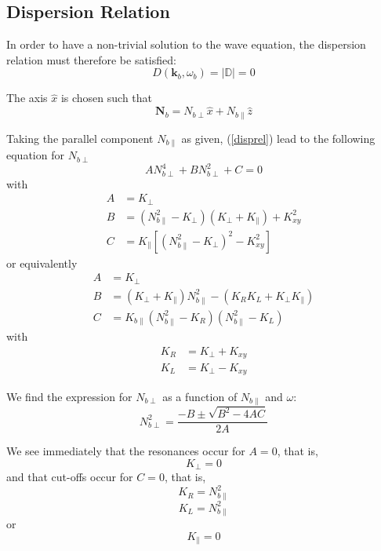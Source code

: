 \subsection{Dispersion Relation}

In order to have a non-trivial solution to the wave equation, the dispersion
relation must therefore be satisfied:
\begin{equation}
D\left(  \mathbf{k}_{b},\omega_{b}\right)  =\left|  \mathbb{D}\right|  =0
\label{disprel}%
\end{equation}

The axis $\widehat{x}$ is chosen such that
\begin{equation}
\mathbf{N}_{b}\mathbf{=}N_{b\perp}\widehat{x}+N_{b\parallel}\widehat{z}%
\end{equation}

Taking the parallel component $N_{b\parallel}$ as given, (\ref{disprel}) lead
to the following equation for $N_{b\perp}$%
\begin{equation}
AN_{b\perp}^{4}+BN_{b\perp}^{2}+C=0
\end{equation}
with
\begin{align}
A  &  =K_{\perp}\\
B  &  =\left(  N_{b\parallel}^{2}-K_{\perp}\right)  \left(  K_{\perp
}+K_{\parallel}\right)  +K_{xy}^{2}\\
C  &  =K_{\parallel}\left[  \left(  N_{b\parallel}^{2}-K_{\perp}\right)
^{2}-K_{xy}^{2}\right]
\end{align}
or equivalently
\begin{align}
A  &  =K_{\perp}\\
B  &  =\left(  K_{\perp}+K_{\parallel}\right)  N_{b\parallel}^{2}-\left(
K_{R}K_{L}+K_{\perp}K_{\parallel}\right) \\
C  &  =K_{b\parallel}\left(  N_{b\parallel}^{2}-K_{R}\right)  \left(
N_{b\parallel}^{2}-K_{L}\right)
\end{align}
with
\begin{align}
K_{R}  &  =K_{\perp}+K_{xy}\\
K_{L}  &  =K_{\perp}-K_{xy}%
\end{align}

We find the expression for $N_{b\perp}$ as a function of $N_{b\parallel}$ and
$\omega$:
\begin{equation}
N_{b\perp}^{2}=\frac{-B\pm\sqrt{B^{2}-4AC}}{2A} \label{nperpform}%
\end{equation}

We see immediately that the resonances occur for $A=0$, that is,
\begin{equation}
K_{\perp}=0
\end{equation}
and that cut-offs occur for $C=0$, that is,
\begin{equation}
K_{R}=N_{b\parallel}^{2}%
\end{equation}%
\begin{equation}
K_{L}=N_{b\parallel}^{2}%
\end{equation}
or
\begin{equation}
K_{\parallel}=0
\end{equation}

